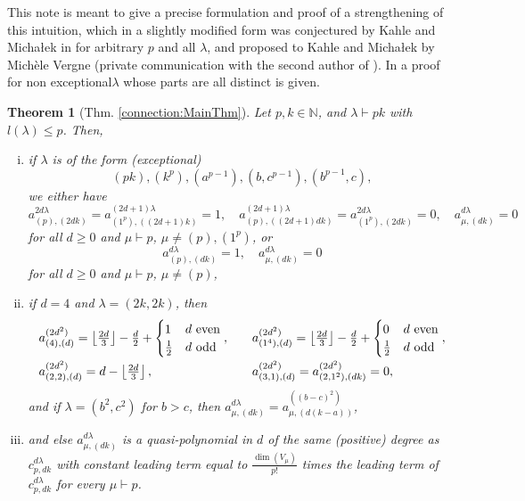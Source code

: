 \documentclass[a4paper]{amsart}
\newtheorem*{theorem*}{Theorem}
\def\N{{\mathbb{N}}}
\begin{document}
This note is meant to give a precise formulation and proof of a strengthening of this intuition, which in a slightly modified form was conjectured by Kahle and Micha\l ek in \cite[Conj. 4.3]{KM16} for arbitrary $p$ and all $\lambda$,
and proposed to Kahle and Micha\l ek by Mich\`ele Vergne (private communication with the second author of \cite{KM16}).
In \cite[Lemma 4.1]{KM16} a proof for \glqq non exceptional\grqq $\lambda$  whose parts are all distinct is given.
\begin{theorem*}[Thm. \ref{connection:MainThm}]
	Let $p,k\in\N$, and $\lambda\vdash pk$ with $l(\lambda)\leq p$.
	Then,
	\begin{enumerate}[(i)]
	\item
		if $\lambda$ is of the form (\glqq exceptional\grqq)
		\begin{displaymath}
			(pk),(k^{p}),(a^{p-1}),(b,c^{p-1}),(b^{p-1},c),
		\end{displaymath}
		we either have
		\begin{displaymath}
			a_{(p),(2dk)}^{2d\lambda}=a_{(1^{p}),((2d+1)k)}^{(2d+1)\lambda}=1,\quad a_{(p),((2d+1)dk)}^{(2d+1)\lambda}=a_{(1^p),(2dk)}^{2d\lambda}=0,\quad
			a_{\mu,(dk)}^{d\lambda}=0
		\end{displaymath}
		for all $d\geq 0$ and $\mu\vdash p$, $\mu\neq (p),(1^p)$, or
		\begin{displaymath}
			a_{(p),(dk)}^{d\lambda}=1,\quad
			a_{\mu,(dk)}^{d\lambda}=0
		\end{displaymath}
		for all $d\geq 0$ and $\mu\vdash p$, $\mu\neq(p)$,
	\item
		if $d=4$ and $\lambda=(2k,2k)$, then
		\begin{displaymath}
		\begin{array}{ll}
			a_{(4),(d)}^{(2d^2)}=
			\left\lfloor\frac{2d}{3}\right\rfloor-\frac{d}{2}+
			\begin{cases}
			1&d\mathrm{\ even}\\
			\frac{1}{2}&d\mathrm{\ odd}
			\end{cases},\quad &
			a_{(1^4),(d)}^{(2d^2)}=\left\lfloor\frac{2d}{3}\right\rfloor-\frac{d}{2}+
			\begin{cases}
			0&d\mathrm{\ even}\\
			\frac{1}{2}&d\mathrm{\ odd}
			\end{cases},\\[\bigskipamount]
			a_{(2,2),(d)}^{(2d^2)}=d-\left\lfloor\frac{2d}{3}\right\rfloor,&
			a_{(3,1),(d)}^{(2d^2)}=a_{(2,1^2),(dk)}^{(2d^2)}=0,
		\end{array}
		\end{displaymath}
		and if $\lambda=(b^2,c^2)$ for $b>c$, then $a_{\mu,(dk)}^{d\lambda}=a_{\mu,(d(k-a))}^{((b-c)^2)}$,
	\item
		and else $a_{\mu,(dk)}^{d\lambda}$ is a quasi-polynomial in $d$ of the same (positive) degree as $c_{p,dk}^{d\lambda}$ with constant leading term equal to $\frac{\dim(V_\mu)}{p!}$ times the leading term of $c_{p,dk}^{d\lambda}$
		for every $\mu\vdash p$.
	\end{enumerate}
\end{theorem*}
\end{document}

